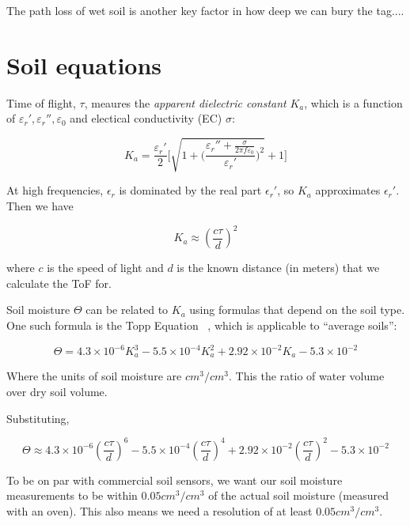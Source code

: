 \documentclass[12pt]{article}
\begin{document}
The path loss of wet soil is another key factor in how deep we can
bury the tag....


\section*{Soil equations}
Time of flight, $\tau$, meaures the \emph{apparent dielectric
  constant} $K_a$, which is a function of
$\varepsilon_r', \varepsilon_r'', \varepsilon_0$ and electical conductivity (EC)
$\sigma$:

\begin{equation}
  K_a = \frac{\varepsilon_r'}{2}\Bigg[\sqrt{1+\bigg(\frac{\varepsilon_r'' + \frac{\sigma}{2\pi f\varepsilon_0}}{\varepsilon_r'}\bigg)^2}+1\Bigg]  
\end{equation}

At high frequencies, $\epsilon_r$ is dominated by the real part
$\epsilon_r'$, so $K_a$ approximates $\epsilon_r'$. Then we have

\begin{equation}
K_a \approx (\frac{c\tau}{d})^2
\end{equation}

where $c$ is the speed of light and $d$ is the known distance (in
meters) that we calculate the ToF for.

Soil moisture $\Theta$ can be related to $K_a$ using formulas that depend on the soil type. One such formula is the Topp Equation ~\cite{Topp1980}, which is applicable to ``average soils'':

\begin{equation}
  \Theta = 4.3\times 10^{-6}K_a^3-5.5\times10^{-4}K_a^2+2.92\times 10^{-2}K_a-5.3\times 10^{-2}
\end{equation}

Where the units of soil moisture are $cm^3/cm^3$. This the ratio of water volume over dry soil volume.

Substituting,

\begin{equation}
  \Theta \approx 4.3\times 10^{-6} (\frac{c\tau}{d})^6-5.5\times10^{-4} (\frac{c\tau}{d})^4+2.92\times 10^{-2} (\frac{c\tau}{d})^2-5.3\times 10^{-2}
\end{equation}

To be on par with commercial soil sensors, we want our soil moisture
measurements to be within $0.05 cm^3/cm^3$ of the actual soil moisture
(measured with an oven). This also means we need a resolution of at
least $0.05 cm^3/cm^3$.
\end{document}
